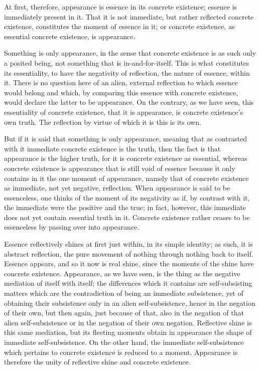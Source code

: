 At first, therefore, appearance is
essence in its concrete existence;
essence is immediately present in it.
That it is not immediate,
but rather reflected concrete existence,
constitutes the moment of essence in it;
or concrete existence, as essential concrete existence,
is appearance.

Something is only appearance,
in the sense that concrete existence is
as such only a posited being,
not something that is in-and-for-itself.
This is what constitutes its essentiality,
to have the negativity of reflection,
the nature of essence, within it.
There is no question here of an alien,
external reflection to which essence would belong
and which, by comparing this essence with concrete existence,
would declare the latter to be appearance.
On the contrary, as we have seen,
this essentiality of concrete existence,
that it is appearance, is
concrete existence's own truth.
The reflection by virtue of which
it is this is its own.

But if it is said that something is only appearance,
meaning that as contrasted with it
immediate concrete existence is the truth,
then the fact is that appearance is the higher truth,
for it is concrete existence as essential,
whereas concrete existence is appearance
that is still void of essence
because it only contains in it
the one moment of appearance,
namely that of concrete existence
as immediate, not yet negative, reflection.
When appearance is said to be essenceless,
one thinks of the moment of its negativity as if,
by contrast with it, the immediate were
the positive and the true;
in fact, however, this immediate does not
yet contain essential truth in it.
Concrete existence rather ceases to be essenceless
by passing over into appearance.

Essence reflectively shines at first
just within, in its simple identity;
as such, it is abstract reflection,
the pure movement of nothing
through nothing back to itself.
Essence appears, and so it now is real shine,
since the moments of the shine have concrete existence.
Appearance, as we have seen, is the thing as
the negative mediation of itself with itself;
the differences which it contains
are self-subsisting matters
which are the contradiction of
being an immediate subsistence,
yet of obtaining their subsistence
only in an alien self-subsistence,
hence in the negation of their own,
but then again, just because of that,
also in the negation of that alien self-subsistence
or in the negation of their own negation.
Reflective shine is this same mediation,
but its fleeting moments obtain in appearance
the shape of immediate self-subsistence.
On the other hand, the immediate self-subsistence
which pertains to concrete existence is reduced to a moment.
Appearance is therefore the unity of
reflective shine and concrete existence.

